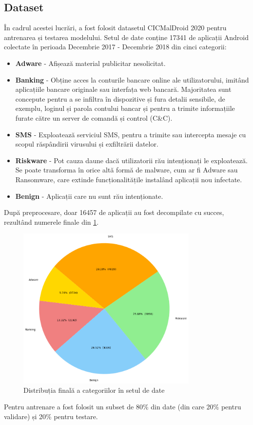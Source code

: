 \documentclass[12pt,a4paper]{report}
\begin{document}
\subsection{Dataset}
În cadrul acestei lucrări, a fost folosit datasetul CICMalDroid 2020 \cite{cicmaldroid0, cicmaldroid1} pentru antrenarea și testarea modelului.
Setul de date conține 17341 de aplicații Android colectate în perioada Decembrie 2017 - Decembrie 2018 din cinci categorii:
\begin{itemize}
      \item \textbf{Adware} - Afișează material publicitar nesolicitat.
      \item \textbf{Banking} - Obține acces la conturile bancare online ale utilizatorului,
            imitând aplicațiile bancare originale sau interfața web bancară.
            Majoritatea sunt concepute pentru a se infiltra în dispozitive și fura detalii sensibile,
            de exemplu, loginul și parola contului bancar și pentru a trimite informațiile
            furate către un server de comandă și control (C\&C).
      \item \textbf{SMS} - Exploatează serviciul SMS, pentru a trimite sau intercepta mesaje cu scopul
            răspândirii virusului și exfiltrării datelor.
      \item \textbf{Riskware} - Pot cauza daune dacă utilizatorii rău intenționați le exploatează.
            Se poate transforma în orice altă formă de malware, cum ar fi Adware sau Ransomware,
            care extinde funcționalitățile instalând aplicații nou infectate.
      \item \textbf{Benign} - Aplicații care nu sunt rău intenționate.
\end{itemize}
După preprocesare, doar 16457 de aplicații au fost decompilate cu succes, rezultând numerele finale din \cref{fig:df_distro}.
\begin{figure}[H]
      \centering
      \includegraphics[width=0.8\textwidth]{visuals/df_distro.png}
      \caption{Distribuția finală a categoriilor în setul de date}
      \label{fig:df_distro}
\end{figure}
Pentru antrenare a fost folosit un subset de 80\% din date (din care 20\% pentru validare) și 20\% pentru testare.
\end{document}

